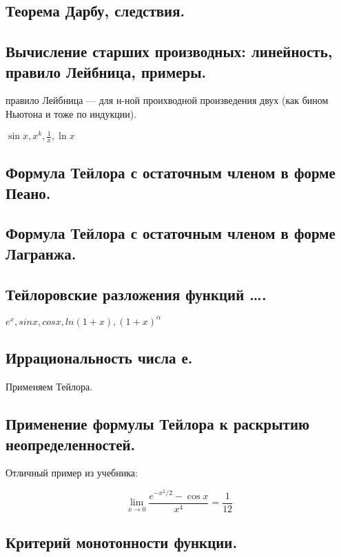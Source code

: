 \documentclass[12pt, a4paper]{article}
\begin{document}
\subsection{Теорема Дарбу, следствия.}

\subsection{Вычисление старших производных: линейность, правило Лейбница, примеры.}

правило Лейбница — для н-ной проихводной произведения двух (как бином Ньютона и тоже по индукции).

$\sin x, x^k, \frac{1}{x}, \ln x$

\subsection{Формула Тейлора с остаточным членом в форме Пеано.}

\subsection{Формула Тейлора с остаточным членом в форме Лагранжа.}

\subsection{Тейлоровские разложения функций ….} %

$e^x, sin x, cos x, ln (1 + x), (1 + x)^{\alpha}$

\subsection{Иррациональность числа е.}

Применяем Тейлора.

\subsection{Применение формулы Тейлора к раскрытию неопределенностей.}

Отличный пример из учебника:

\begin{equation*}
    \lim_{x \rightarrow 0} \frac{e^{-x^{2} / 2}-\cos x}{x^{4}} = \frac{1}{12}
\end{equation*}

\subsection{Критерий монотонности функции.}
\end{document}
